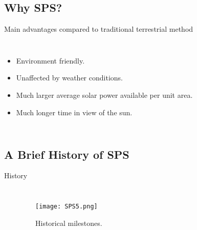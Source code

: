 \documentclass{beamer}
\begin{document}
\subsection{Why SPS?}
\begin{frame}[label=why1]{Main advantages}
  {compared to traditional terrestrial method}
  \begin{columns}
    \begin{itemize}
      
    \item<2-> Environment friendly.
    \item<3-> Unaffected by weather conditions.
    \item<4-> Much larger average solar power available per unit area.
    \item<5-> Much longer time in view of the sun.
    \end{itemize}

    \begin{figure}[H]
     \centering
    \end{figure}
  \end{columns}
\end{frame}


\subsection{A Brief History of SPS}
\begin{frame}[label=his]{History}
  \begin{columns}
    \begin{itemize}
      
    \end{itemize}
    \begin{figure}[H]
     \centering
      \texttt{[image: SPS5.png]}
      \caption{Historical milestones.\cite{MPTtech4SPS}}
    \end{figure}
  \end{columns}
\end{frame}
\end{document}
